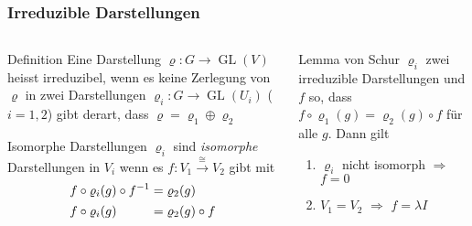 %
%
%
\bgroup
\begin{frame}[t]
\setlength{\abovedisplayskip}{5pt}
\setlength{\belowdisplayskip}{5pt}
\frametitle{Irreduzible Darstellungen}
\vspace{-20pt}
\begin{columns}[t,onlytextwidth]
\begin{column}{0.48\textwidth}
\begin{block}{Definition}
Eine Darstellung $\varrho\colon G\to\operatorname{GL}(V)$ heisst
irreduzibel, wenn es keine Zerlegung von $\varrho$ in zwei
Darstellungen $\varrho_i\colon G\to\operatorname{GL}(U_i)$ ($i=1,2$)
gibt derart, dass $\varrho = \varrho_1\oplus\varrho_2$
\end{block}
\begin{block}{Isomorphe Darstellungen}
$\varrho_i$ sind {\em isomorphe} Darstellungen in $V_i$ wenn es
$f\colon V_1\overset{\cong}{\to} V_2$ gibt mit
\begin{align*}
f \circ \varrho_i(g)\circ f^{-1} &= \varrho_2(g)
\\
f \circ \varrho_i(g)\phantom{\mathstrut\circ f^{-1}}&= \varrho_2(g)\circ f 
\end{align*}
\end{block}
\end{column}
\begin{column}{0.48\textwidth}
\begin{block}{Lemma von Schur}
$\varrho_i$ zwei irreduzible Darstellungen und $f$ so, dass
$f\circ \varrho_1(g)=\varrho_2(g)\circ f$ für alle $g$.
Dann gilt
\begin{enumerate}
\item $\varrho_i$ nicht isomorph $\Rightarrow$ $f=0$
\item $V_1=V_2$ $\Rightarrow$ $f=\lambda I$
\end{enumerate}
\end{block}
\end{column}
\end{columns}
\end{frame}
\egroup

